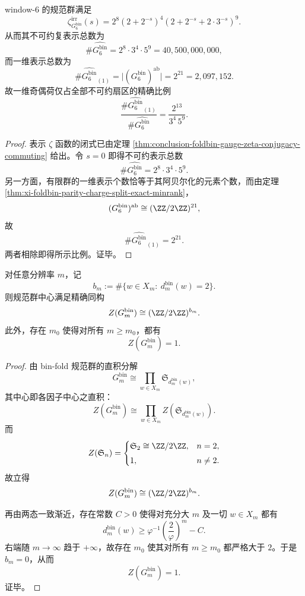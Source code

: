 \begin{corollary}\label{cor:conclusion-window6-representation-zeta-count-ratio}
window-\(6\) 的规范群满足
\[
\zeta_{G_6^{\mathrm{bin}}}^{\mathrm{irr}}(s)
=
2^8(2+2^{-s})^4(2+2^{-s}+2\cdot 3^{-s})^9.
\]
从而其不可约复表示总数为
\[
\#\widehat{G_6^{\mathrm{bin}}}
=
2^8\cdot 3^4\cdot 5^9
=
40{,}500{,}000{,}000,
\]
而一维表示总数为
\[
\#\widehat{G_6^{\mathrm{bin}}}_{(1)}
=
\bigl|(G_6^{\mathrm{bin}})^{\mathrm{ab}}\bigr|
=
2^{21}
=
2{,}097{,}152.
\]
故一维奇偶荷仅占全部不可约扇区的精确比例
\[
\frac{\#\widehat{G_6^{\mathrm{bin}}}_{(1)}}{\#\widehat{G_6^{\mathrm{bin}}}}
=
\frac{2^{13}}{3^4\,5^9}.
\]
\end{corollary}
\begin{proof}
表示 \(\zeta\) 函数的闭式已由定理 \ref{thm:conclusion-foldbin-gauge-zeta-conjugacy-commuting} 给出。令 \(s=0\) 即得不可约表示总数
\[
\#\widehat{G_6^{\mathrm{bin}}}=2^8\cdot 3^4\cdot 5^9.
\]
另一方面，有限群的一维表示个数恰等于其阿贝尔化的元素个数，而由定理 \ref{thm:xi-foldbin-parity-charge-split-exact-minrank}，
\[
(G_6^{\mathrm{bin}})^{\mathrm{ab}}\cong (\ZZ/2\ZZ)^{21},
\]
故
\[
\#\widehat{G_6^{\mathrm{bin}}}_{(1)}=2^{21}.
\]
两者相除即得所示比例。证毕。
\end{proof}

\begin{theorem}\label{thm:conclusion-binfold-gauge-center-eventual-triviality}
对任意分辨率 \(m\)，记
\[
b_m:=\#\{w\in X_m:\ d_m^{\mathrm{bin}}(w)=2\}.
\]
则规范群中心满足精确同构
\[
Z(G_m^{\mathrm{bin}})\cong (\ZZ/2\ZZ)^{b_m}.
\]
此外，存在 \(m_0\) 使得对所有 \(m\ge m_0\)，都有
\[
Z(G_m^{\mathrm{bin}})=1.
\]
\end{theorem}
\begin{proof}
由 bin-fold 规范群的直积分解
\[
G_m^{\mathrm{bin}}\cong \prod_{w\in X_m}\mathfrak S_{d_m^{\mathrm{bin}}(w)},
\]
其中心即各因子中心之直积：
\[
Z(G_m^{\mathrm{bin}})
\cong
\prod_{w\in X_m} Z\!\left(\mathfrak S_{d_m^{\mathrm{bin}}(w)}\right).
\]
而
\[
Z(\mathfrak S_n)=
\begin{cases}
\mathfrak S_2\cong \ZZ/2\ZZ,& n=2,\\[3pt]
1,& n\neq 2.
\end{cases}
\]
故立得
\[
Z(G_m^{\mathrm{bin}})\cong (\ZZ/2\ZZ)^{b_m}.
\]

再由两态一致渐近，存在常数 \(C>0\) 使得对充分大 \(m\) 及一切 \(w\in X_m\) 都有
\[
d_m^{\mathrm{bin}}(w)
\ge
\varphi^{-1}\left(\frac{2}{\varphi}\right)^m-C.
\]
右端随 \(m\to\infty\) 趋于 \(+\infty\)，故存在 \(m_0\) 使其对所有 \(m\ge m_0\) 都严格大于 \(2\)。于是 \(b_m=0\)，从而
\[
Z(G_m^{\mathrm{bin}})=1.
\]
证毕。
\end{proof}

